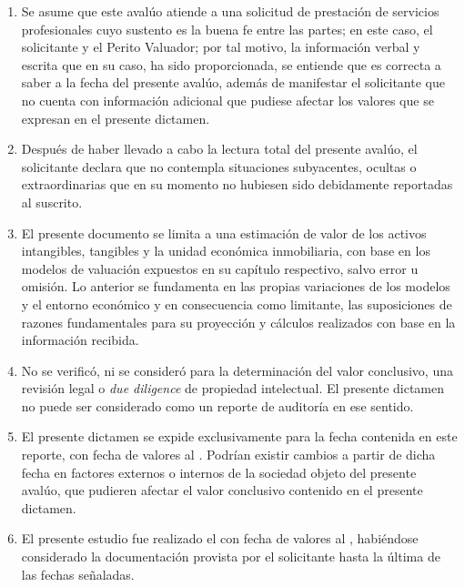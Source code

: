 \begin{enumerate}[\indent a)]
\item Se asume que este aval\'uo atiende a una solicitud de prestaci\'on de servicios profesionales cuyo sustento es  la buena fe entre las partes; en este caso, el solicitante y el Perito Valuador; por tal motivo, la informaci\'on verbal y escrita que en su caso, ha sido proporcionada, se entiende que es correcta a saber a la fecha del presente aval\'uo, adem\'as de manifestar el solicitante que no cuenta con informaci\'on adicional  que pudiese afectar los valores que se expresan en el presente dictamen.

\item Despu\'es de haber llevado a cabo la lectura total del presente aval\'uo, el solicitante declara que no contempla situaciones subyacentes, ocultas o extraordinarias que en su momento no hubiesen sido debidamente reportadas al suscrito.

\item El presente documento se limita a una estimaci\'on de valor de los activos intangibles, tangibles y la unidad econ\'omica inmobiliaria, con base en los modelos de valuaci\'on expuestos en su cap\'itulo respectivo, salvo error u omisi\'on. Lo anterior se fundamenta en las propias variaciones de los modelos y el entorno econ\'omico y en consecuencia como limitante, las suposiciones de razones fundamentales para su proyecci\'on y c\'alculos realizados con base en la informaci\'on recibida.

\item No se verific\'o, ni se consider\'o para la determinaci\'on del valor conclusivo, una revisi\'on legal o \textit{due diligence} de propiedad intelectual. El presente dictamen no puede ser considerado como un reporte de auditor\'ia en ese sentido. 

\item El presente dictamen se expide exclusivamente para la fecha contenida en este reporte, con fecha de valores  al \textcolor{principal}{\fechaValores}. Podr\'ian existir cambios a partir de dicha fecha en factores externos o internos   de la sociedad objeto del presente aval\'uo, que pudieren afectar el valor conclusivo contenido en el presente dictamen.

\item El presente estudio fue realizado el \textcolor{principal}{\fechaVisita} con fecha de valores al \textcolor{principal}{\fechaValores}, habi\'endose considerado la documentaci\'on provista por el solicitante hasta la \'ultima de las fechas se\~naladas.



\end{enumerate}
